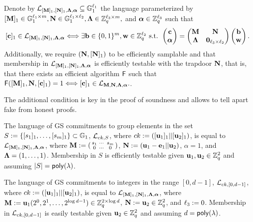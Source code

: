 \begin{definition}
Denote by $\mathcal{L}_{[\mathbf{{M}}]_1,[\mathbf{{N}}]_1,\mathbf{{\Lambda}},{\boldsymbol \alpha}}\subseteq\mathbb{G}_1^{\ell_1}$ the language parameterized by $[\mathbf{{M}}]_1 \in\mathbb{G}_1^{{\ell_1}\times {m}},\mathbf{{N}}\in\mathbb{G}_1^{{\ell_1}\times {\ell_2}},\mathbf{{\Lambda}}\in\mathbb{Z}_q^{{\ell_3}\times{m}},$ and ${\boldsymbol \alpha}\in\mathbb{Z}_q^{\ell_3}$ such that
\begin{equation}\label{eq:definition1}
[\mathbf{c}]_1\in\mathcal{L}_{[\mathbf{{M}}]_1,[\mathbf{{N}}]_1,\mathbf{{\Lambda}},{\boldsymbol \alpha}} \Longleftrightarrow \exists \mathbf{b}\in\{0,1\}^{m},\mathbf{w}\in\mathbb{Z}_q^{\ell_2} \text{ s.t. }
\left(\begin{matrix}
    \mathbf{c}\\
    {\boldsymbol \alpha}
\end{matrix}\right)
=
\begin{pmatrix}
    \mathbf{{M}}       & \mathbf{{N}}\\
    \mathbf{{\Lambda}} & \mathbf{{0}}_{{\ell_3}\times {\ell_2}}
\end{pmatrix}
\left(\begin{matrix}
    \mathbf{b}\\
    \mathbf{w}
\end{matrix}\right).
\end{equation}
Additionally, we require $(\mathbf{{N}},[\mathbf{{N}}]_1)$ to be efficiently samplable and that membership in $\mathcal{L}_{[\mathbf{{M}}]_1,[\mathbf{{N}}]_1,\mathbf{{\Lambda}},{\boldsymbol \alpha}}$ is efficiently testable with the trapdoor $\mathbf{{N}}$, that is, that there exists an efficient algorithm $\mathsf{F}$ such that $\mathsf{F}([\mathbf{{M}}]_1,\mathbf{{N}},[\mathbf{c}]_1)=1\Longleftrightarrow [\mathbf{c}]_1\in\mathcal{L}_{\mathbf{{M}},\mathbf{{N}},\mathbf{{\Lambda}},{\boldsymbol \alpha}}.$. 
\end{definition}
The additional condition is key in the proof of soundness and allows to tell apart fake from honest proofs.
\begin{example}
The language of GS commitments to group elements in the set $S:=\{[s_1]_1,\ldots,[s_{m}]_1\} \subset \mathbb{G}_1$, $\mathcal{L}_{ck,S}$, where $ck:=([\mathbf{u}_1]_1||[\mathbf{u}_2]_1)$, is equal to $\mathcal{L}_{[\mathbf{{M}}]_1,[\mathbf{{N}}]_1,\mathbf{{\Lambda}},{\boldsymbol \alpha}}$, where
$\mathbf{{M}}:=\left(\begin{smallmatrix}s_1 & \cdots & s_{m} \\ 0 &\cdots & 0\end{smallmatrix}\right)$, $\mathbf{{N}}:=(\mathbf{u}_1-\mathbf{e}_1||\mathbf{u}_2)$, $\alpha=1$, and $\mathbf{{\Lambda}}=(1,\ldots,1)$. Membership in $S$ is efficiently testable given $\mathbf{u}_1,\mathbf{u}_2\in\mathbb{Z}_q^2$ and assuming $|S|=\mathsf{poly}(\lambda)$.
\end{example}

\begin{example}
The language of GS commitments to integers in the range $[0,d-1]$, $\mathcal{L}_{ck,[0,d-1]}$, where $ck:=([\mathbf{u}_1]_1||[\mathbf{u}_2]_1)$, is equal to $\mathcal{L}_{[\mathbf{{M}}]_1,[\mathbf{{N}}]_1,\mathbf{{\Lambda}},{\boldsymbol \alpha}}$, where
$\mathbf{{M}}:=\mathbf{u}_1(2^0,2^1,\ldots,2^{\log d-1})\in\mathbb{Z}_q^{2\times \log d}$, $\mathbf{{N}}:=\mathbf{u}_2\in\mathbb{Z}_q^{2}$, and ${\ell_3}:=0$. Membership in $\mathcal{L}_{ck,[0,d-1]}$ is easily testable given $\mathbf{u}_2 \in \mathbb{Z}_q^2$ and assuming $d=\mathsf{poly}(\lambda)$. 
\end{example}

